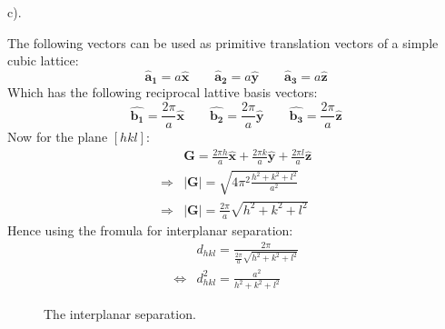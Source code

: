 \documentclass[a4paper,12pt]{article}
\newcommand{\af}{\pmb{\hat a_1}}
\newcommand{\as}{\pmb{\hat a_2}}
\newcommand{\at}{\pmb{\hat a_3}}
\newcommand\uv[1]{\pmb{\hat {#1}}}
\begin{document}
\begin{minipage}[t]{0.9\textwidth}
  c).
  \begin{minipage}[t]{\textwidth}
    The following vectors can be used as primitive translation vectors of a simple cubic lattice:
    \begin{equation*}
      \af = a \uv{x} \qquad \as = a \uv{y} \qquad \at = a \uv{z}
    \end{equation*}
    Which has the following reciprocal lattive basis vectors:
    \begin{equation*}
      \uv{b_1} = \frac{2 \pi}{a} \uv{x} \qquad \uv{b_2} = \frac{2 \pi}{a} \uv{y} \qquad \uv{b_3} =  \frac{2 \pi}{a}\uv{z}
    \end{equation*}
    Now for the plane $[hkl]$:
    \begin{align*}
                  & \pmb{G} = \frac{2 \pi h}{a} \uv{x} + \frac{2 \pi k}{a} \uv{y} + \frac{2 \pi l}{a} \uv{z}\\
      \Rightarrow & \left| \pmb{G} \right| = \sqrt{4 \pi^2 \frac{h^2 + k^2 + l^2}{a^2}}\\
      \Rightarrow & \left| \pmb{G} \right| = \frac{2 \pi}{a} \sqrt{h^2 + k^2 + l^2}
    \end{align*}
    Hence using the fromula for interplanar separation:
    \begin{align*}
                      & d_{hkl} = \frac{2 \pi}{\frac{2 \pi}{a} \sqrt{h^2 + k^2 + l^2}}\\
      \Leftrightarrow & d^2_{hkl} = \frac{a^2}{h^2 + k^2 + l^2}
    \end{align*}
  \end{minipage}
\end{minipage}
  \begin{figure}
  \centering
  \caption{The interplanar separation.}
  \label{fig:planeSep}
\end{figure}
\end{document}
